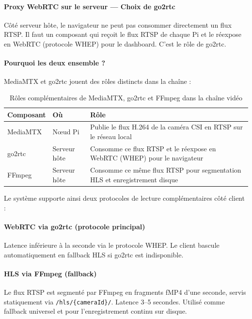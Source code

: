 \documentclass[12pt,a4paper]{article}
\begin{document}
\paragraph{Proxy WebRTC sur le serveur --- Choix de go2rtc}

Côté serveur hôte, le navigateur ne peut pas consommer directement un flux RTSP. Il faut un composant qui reçoit le flux RTSP de chaque Pi et le réexpose en WebRTC (protocole WHEP) pour le dashboard. C'est le rôle de go2rtc.

\paragraph{Pourquoi les deux ensemble ?}

MediaMTX et go2rtc jouent des rôles distincts dans la chaîne :

\begin{table}[H]
\centering
\small
\begin{tabular}{|l|l|l|}
\hline
\textbf{Composant} & \textbf{Où} & \textbf{Rôle} \\
\hline
MediaMTX & Nœud Pi & Publie le flux H.264 de la caméra CSI en RTSP sur le réseau local \\
\hline
go2rtc & Serveur hôte & Consomme ce flux RTSP et le réexpose en WebRTC (WHEP) pour le navigateur \\
\hline
FFmpeg & Serveur hôte & Consomme ce même flux RTSP pour segmentation HLS et enregistrement disque \\
\hline
\end{tabular}
\caption{Rôles complémentaires de MediaMTX, go2rtc et FFmpeg dans la chaîne vidéo}
\end{table}

Le système supporte ainsi deux protocoles de lecture complémentaires côté client :

\paragraph{WebRTC via go2rtc (protocole principal)}
Latence inférieure à la seconde via le protocole WHEP. Le client bascule automatiquement en fallback HLS si go2rtc est indisponible.

\paragraph{HLS via FFmpeg (fallback)}
Le flux RTSP est segmenté par FFmpeg en fragments fMP4 d'une seconde, servis statiquement via \texttt{/hls/\{cameraId\}/}. Latence 3--5 secondes. Utilisé comme fallback universel et pour l'enregistrement continu sur disque.
\end{document}
